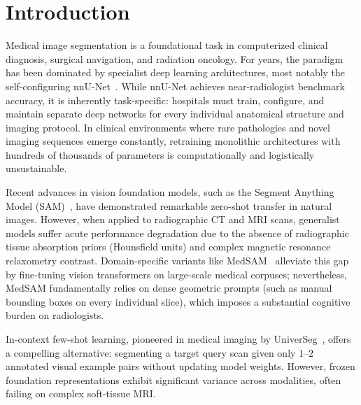 \documentclass[runningheads]{llncs}
\begin{document}
\section{Introduction}
\label{sec:intro}
Medical image segmentation is a foundational task in computerized clinical diagnosis, surgical navigation, and radiation oncology. For years, the paradigm has been dominated by specialist deep learning architectures, most notably the self-configuring nnU-Net~\cite{isensee2021nnu}. While nnU-Net achieves near-radiologist benchmark accuracy, it is inherently task-specific: hospitals must train, configure, and maintain separate deep networks for every individual anatomical structure and imaging protocol. In clinical environments where rare pathologies and novel imaging sequences emerge constantly, retraining monolithic architectures with hundreds of thousands of parameters is computationally and logistically unsustainable.

Recent advances in vision foundation models, such as the Segment Anything Model (SAM)~\cite{kirillov2023segment}, have demonstrated remarkable zero-shot transfer in natural images. However, when applied to radiographic CT and MRI scans, generalist models suffer acute performance degradation due to the absence of radiographic tissue absorption priors (Hounsfield units) and complex magnetic resonance relaxometry contrast. Domain-specific variants like MedSAM~\cite{ma2024segment} alleviate this gap by fine-tuning vision transformers on large-scale medical corpuses; nevertheless, MedSAM fundamentally relies on dense geometric prompts (such as manual bounding boxes on every individual slice), which imposes a substantial cognitive burden on radiologists.

In-context few-shot learning, pioneered in medical imaging by UniverSeg~\cite{butoi2023universeg}, offers a compelling alternative: segmenting a target query scan given only $1\text{--}2$ annotated visual example pairs without updating model weights. However, frozen foundation representations exhibit significant variance across modalities, often failing on complex soft-tissue MRI. 
\end{document}
